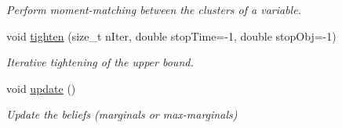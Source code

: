 \begin{DoxyCompactItemize}
\begin{DoxyCompactList}\small\item\em Perform moment-\/matching between the clusters of a variable. \end{DoxyCompactList}\item 
void \hyperlink{classmerlin_1_1wmb_a5ef13c682161de26ab1f89b3719e69e3}{tighten} (size\+\_\+t n\+Iter, double stop\+Time=-\/1, double stop\+Obj=-\/1)\hypertarget{classmerlin_1_1wmb_a5ef13c682161de26ab1f89b3719e69e3}{}\label{classmerlin_1_1wmb_a5ef13c682161de26ab1f89b3719e69e3}

\begin{DoxyCompactList}\small\item\em Iterative tightening of the upper bound. \end{DoxyCompactList}\item 
void \hyperlink{classmerlin_1_1wmb_a761421a2ad5cd8bcba09a69b7e9713a6}{update} ()\hypertarget{classmerlin_1_1wmb_a761421a2ad5cd8bcba09a69b7e9713a6}{}\label{classmerlin_1_1wmb_a761421a2ad5cd8bcba09a69b7e9713a6}

\begin{DoxyCompactList}\small\item\em Update the beliefs (marginals or max-\/marginals) \end{DoxyCompactList}\end{DoxyCompactItemize}
